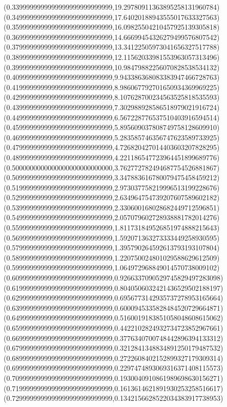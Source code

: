 \documentclass[11pt]{report}
\begin{document}
\begin{center}
  (0.3399999999999999999999999999,19.29780911363895258131960784)
  (0.3499999999999999999999999999,17.64020188943555017633327563)
  (0.3599999999999999999999999999,16.09825504210457925139305818)
  (0.3699999999999999999999999999,14.66699454326279499576807542)
  (0.3799999999999999999999999999,13.34122505973041656327517788)
  (0.3899999999999999999999999999,12.11562033981553963057313496)
  (0.3999999999999999999999999999,10.98479882256070828538534132)
  (0.4099999999999999999999999999,9.943386368083383947466728763)
  (0.4199999999999999999999999999,8.986067792701650934369969225)
  (0.4299999999999999999999999999,8.107628700234563525818535593)
  (0.4399999999999999999999999999,7.302988928586518979021916724)
  (0.4499999999999999999999999999,6.567228776537510403916594514)
  (0.4599999999999999999999999999,5.895609037808749758128609910)
  (0.4699999999999999999999999999,5.283585746356747623589733925)
  (0.4799999999999999999999999999,4.726820427014403603207828295)
  (0.4899999999999999999999999999,4.221186547723964451899689776)
  (0.5000000000000000000000000000,3.762772782494687754526881867)
  (0.5099999999999999999999999999,3.347883616780079475458459212)
  (0.5199999999999999999999999999,2.973037758219996513199228676)
  (0.5299999999999999999999999999,2.634964754739207607589602182)
  (0.5399999999999999999999999999,2.330600168028682449712596851)
  (0.5499999999999999999999999999,2.057079602728938881782014276)
  (0.5599999999999999999999999999,1.811731849526851974888215643)
  (0.5699999999999999999999999999,1.592071363273333449258930595)
  (0.5799999999999999999999999999,1.395790264592613793193107804)
  (0.5899999999999999999999999999,1.220750024801029588629612509)
  (0.5999999999999999999999999999,1.064972968849014570738009102)
  (0.6099999999999999999999999999,0.9266337090529745829497283098)
  (0.6199999999999999999999999999,0.8040506032421436529502188197)
  (0.6299999999999999999999999999,0.6956773142935737278953165664)
  (0.6399999999999999999999999999,0.6000945335828484520729664871)
  (0.6499999999999999999999999999,0.5160019183851058048608615062)
  (0.6599999999999999999999999999,0.4422102824932734723852967661)
  (0.6699999999999999999999999999,0.3776340700748442896394133312)
  (0.6799999999999999999999999999,0.3212841348834891250179487532)
  (0.6899999999999999999999999999,0.2722608402152899327179309314)
  (0.6999999999999999999999999999,0.2297474893069316371408115573)
  (0.7099999999999999999999999999,0.1930040910861989698630156271)
  (0.7199999999999999999999999999,0.1613614621891930253258516617)
  (0.7299999999999999999999999999,0.1342156628522034383917738953)

\end{center}
\end{document}
